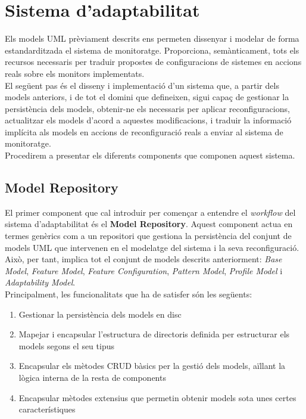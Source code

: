 
\chapter{Sistema d'adaptabilitat} %

\label{DissenySistema} %

Els models UML prèviament descrits ens permeten dissenyar i modelar de forma estandarditzada el sistema de monitoratge. Proporciona, semànticament, tots els recursos necessaris per traduir propostes de configuracions de sistemes en accions reals sobre els monitors implementats.\\

El següent pas és el disseny i implementació d'un sistema que, a partir dels models anteriors, i de tot el domini que defineixen, sigui capaç de gestionar la persistència dels models, obtenir-ne els necessaris per aplicar reconfiguracions, actualitzar els models d'acord a aquestes modificacions, i traduir la informació implícita als models en accions de reconfiguració reals a enviar al sistema de monitoratge.\\

Procedirem a presentar els diferents components que componen aquest sistema.

\section{Model Repository}

El primer component que cal introduir per començar a entendre el \textit{workflow} del sistema d'adaptabilitat és el \textbf{Model Repository}. Aquest component actua en termes genèrics com a un repositori que gestiona la persistència del conjunt de models UML que intervenen en el modelatge del sistema i la seva reconfiguració. Això, per tant, implica tot el conjunt de models descrits anteriorment: \textit{Base Model}, \textit{Feature Model}, \textit{Feature Configuration}, \textit{Pattern Model}, \textit{Profile Model} i \textit{Adaptability Model}.\\

Principalment, les funcionalitats que ha de satisfer són les següents:

\begin{enumerate}
\item Gestionar la persistència dels models en disc
\item Mapejar i encapsular l'estructura de directoris definida per estructurar els models segons el seu tipus
\item Encapsular els mètodes CRUD bàsics per la gestió dels models, aïllant la lògica interna de la resta de components
\item Encapsular mètodes extensius que permetin obtenir models sota unes certes característiques
\end{enumerate}

